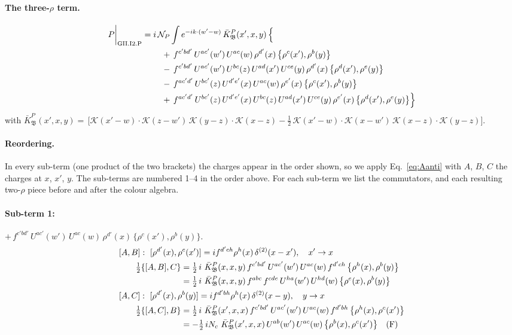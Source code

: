 \documentclass[10pt]{article}
\numberwithin{equation}{section}
\newcommand{\KK}{\mathcal K}
\newcommand{\NP}{\mathcal N_{P}}
\begin{document}
\paragraph{The three-$\rho$ term.}
\begin{align}
P\bigg|_{\rm GII.I2.P}={}&i\,\NP\int e^{-ik\cdot(w'-w)}\,\bar K^{P}_{\mathfrak B}(x',x,y)\,\Big\{\notag\\
&\quad +\,f^{c'bd'}\,U^{ac'}(w')\,U^{ac}(w)\,\rho^{d'}(x)\,\big\{\rho^{c}(x'),\rho^{b}(y)\big\}\notag\\
&\quad -\,f^{c'bd'}\,U^{ac'}(w')\,U^{bc}(z)\,U^{ad}(x')\,U^{ce}(y)\,\rho^{d'}(x)\,\big\{\rho^{d}(x'),\rho^{e}(y)\big\}\notag\\
&\quad -\,f^{ac'd'}\,U^{bc'}(z)\,U^{d'e'}(x)\,U^{ac}(w)\,\rho^{e'}(x)\,\big\{\rho^{c}(x'),\rho^{b}(y)\big\}\notag\\
&\quad +\,f^{ac'd'}\,U^{bc'}(z)\,U^{d'e'}(x)\,U^{bc}(z)\,U^{ad}(x')\,U^{ce}(y)\,\rho^{e'}(x)\,\big\{\rho^{d}(x'),\rho^{e}(y)\big\}\Big\}\label{eq:in-GII.I2.P}
\end{align}
with $\bar K^{P}_{\mathfrak B}(x',x,y)=\,\Big[\KK(x'-w)\cdot\KK(z-w')\,\KK(y-z)\cdot\KK(x-z)-\frac{1}{2}\,\KK(x'-w)\cdot\KK(x-w')\,\KK(x-z)\cdot\KK(y-z)\Big]$.
\paragraph{Reordering.} In every sub-term (one product of the two brackets) the charges appear in the order shown, so we apply Eq.~\eqref{eq:Aanti} with $A$, $B$, $C$ the charges at $x$, $x'$, $y$. The sub-terms are numbered 1--4 in the order above. For each sub-term we list the commutators, and each resulting two-$\rho$ piece before and after the colour algebra.
\paragraph{Sub-term 1:} $+\,f^{c'bd'}\,U^{ac'}(w')\,U^{ac}(w)\,\rho^{d'}(x)\,\big\{\rho^{c}(x'),\rho^{b}(y)\big\}$.
\begin{align}
&[A,B]:\ [\rho^{d'}(x),\rho^{c}(x')]=i f^{d'ch}\rho^{h}(x)\,\delta^{(2)}(x-x'),\quad x'\to x\notag\\
&\qquad \tfrac12\{[A,B],C\}=\tfrac12\,i\,\,\bar K^{P}_{\mathfrak B}(x,x,y)\,f^{c'bd'}\,U^{ac'}(w')\,U^{ac}(w)\,f^{d'ch}\,\big\{\rho^{h}(x),\rho^{b}(y)\big\}\notag\\
&\qquad\phantom{\tfrac12\{[A,B],C\}}=\tfrac12\,i\,\,\bar K^{P}_{\mathfrak B}(x,x,y)\,f^{abc}\,f^{cde}\,U^{ha}(w')\,U^{hd}(w)\,\big\{\rho^{e}(x),\rho^{b}(y)\big\}
\label{eq:GII.I2.P-1-AB}\\
&[A,C]:\ [\rho^{d'}(x),\rho^{b}(y)]=i f^{d'bh}\rho^{h}(x)\,\delta^{(2)}(x-y),\quad y\to x\notag\\
&\qquad \tfrac12\{[A,C],B\}=\tfrac12\,i\,\,\bar K^{P}_{\mathfrak B}(x',x,x)\,f^{c'bd'}\,U^{ac'}(w')\,U^{ac}(w)\,f^{d'bh}\,\big\{\rho^{h}(x),\rho^{c}(x')\big\}\notag\\
&\qquad\phantom{\tfrac12\{[A,C],B\}}=-\tfrac12\,i N_{c}\,\,\bar K^{P}_{\mathfrak B}(x',x,x)\,U^{ab}(w')\,U^{ac}(w)\,\big\{\rho^{b}(x),\rho^{c}(x')\big\}\quad\text{(F)}
\label{eq:GII.I2.P-1-AC}
\end{align}
\end{document}
